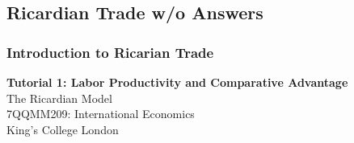 \documentclass{beamer}
\begin{document}













\subsection{Ricardian Trade w/o Answers}

\subsubsection{Introduction to Ricarian Trade}


\begin{frame}

\vspace{1.5cm}

\centering
{\Large \textbf{Tutorial 1: Labor Productivity and Comparative Advantage}} \\[0.5cm]
{\large The Ricardian Model} \\[1.0cm]

{\small 7QQMM209: International Economics} \\[0.3cm]
{\small King's College London}

\vfill

\end{frame}
\end{document}
